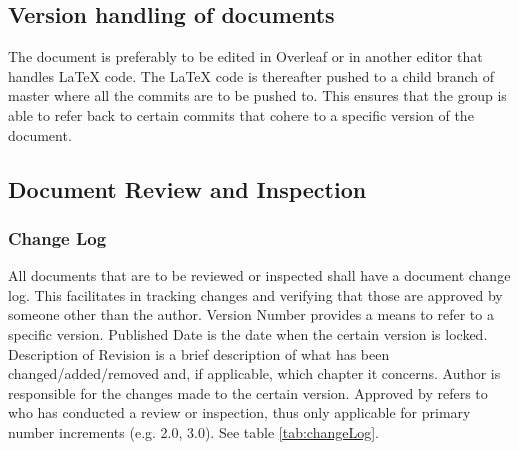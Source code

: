 \subsection{Version handling of documents} 
The document is preferably to be edited in Overleaf or in another editor that handles LaTeX code. The LaTeX code is thereafter pushed to a child branch of master where all the commits are to be pushed to. This ensures that the group is able to refer back to certain commits that cohere to a specific version of the document. 

\subsection{Document Review and Inspection}
	
	\subsubsection{Change Log}
	All documents that are to be reviewed or inspected shall have a document change log. This facilitates in tracking changes and verifying that those are approved by someone other than the author. Version Number provides a means to refer to a specific version. Published Date is the date when the certain version is locked. Description of Revision is a brief description of what has been changed/added/removed and, if applicable, which chapter it concerns. Author is responsible for the changes made to the certain version. Approved by refers to who has conducted a review or inspection, thus only applicable for primary number increments (e.g. 2.0, 3.0). See table \ref{tab:changeLog}.
	
	
	\begin{table}[h]
		\noindent{}
		\caption{Example of Change Log}
		\label{tab:changeLog}
	\end{table}
	

